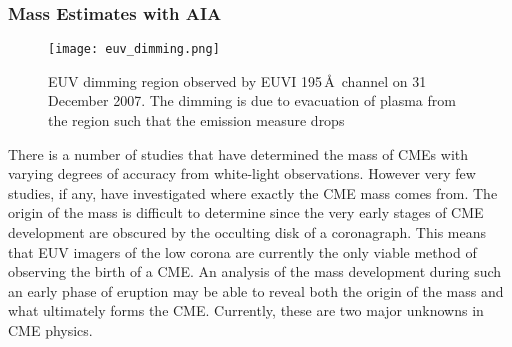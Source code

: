 
\subsubsection{Mass Estimates with AIA}
\begin{figure}[t!]
\begin{center}
\texttt{[image: euv\_dimming.png]}
\caption[EUVI dimming region]{EUV dimming region observed by EUVI 195\,\AA~channel on 31 December 2007. The dimming is due to evacuation of plasma from the region such that the emission measure drops \citep{aschw09}}
\end{center}
\end{figure}
There is a number of studies that have determined the mass of CMEs with varying degrees of accuracy from white-light observations. However very few studies, if any, have investigated where exactly the CME mass comes from. The origin of the mass is difficult to determine since the very early stages of CME development are obscured by the occulting disk of a coronagraph. This means that EUV imagers of the low corona are currently the only viable method of observing the birth of a CME. An analysis of the mass development during such an early phase of eruption may be able to reveal both the origin of the mass and what ultimately forms the CME. Currently, these are two major unknowns in CME physics.

